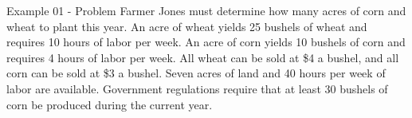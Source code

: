 \begin{frame}{Example 01 - Problem}
Farmer Jones must determine how many acres of corn and wheat to plant this year.
An acre of wheat yields 25 bushels of wheat and requires 10 hours of labor per
week. An acre of corn yields 10 bushels of corn and requires 4 hours of labor
per week. All wheat can be sold at \$4 a bushel, and all corn can be sold at
\$3 a bushel. Seven acres of land and 40 hours per week of labor are available.
Government regulations require that at least 30 bushels of corn be produced
during the current year.
\end{frame}
